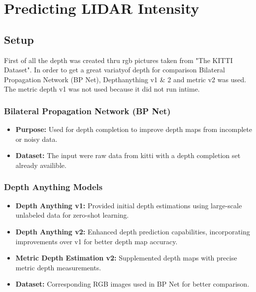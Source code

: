 \chapter{Predicting LIDAR Intensity} %
\section{Setup}
First of all the depth was created thru rgb pictures taken from "The KITTI Dataset". In order to get a great variatyof depth for comparison Bilateral Propagation Network (BP Net), Depthanything v1 \& 2 and metric v2 was used. The metric depth v1 was not used because it did not run intime.
\subsection{Bilateral Propagation Network (BP Net)}
\begin{itemize}
	\item \textbf{Purpose:} Used for depth completion to improve depth maps from incomplete or noisy data.
	\item \textbf{Dataset:} The input were raw data from kitti with a depth completion set already availible. 
\end{itemize}

\subsection{Depth Anything Models}
\begin{itemize}
	\item \textbf{Depth Anything v1:} Provided initial depth estimations using large-scale unlabeled data for zero-shot learning.
	\item \textbf{Depth Anything v2:} Enhanced depth prediction capabilities, incorporating improvements over v1 for better depth map accuracy.


 	\item \textbf {Metric Depth Estimation v2:} Supplemented depth maps with precise metric depth measurements.

	\item \textbf{Dataset:} Corresponding RGB images used in BP Net for better comparison.
\end{itemize}

